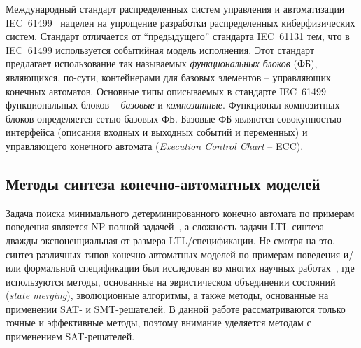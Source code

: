 
Международный стандарт распределенных систем управления и автоматизации IEC~61499~\cite{vyatkin-tii} нацелен на упрощение разработки распределенных киберфизических систем.
Стандарт отличается от \enquote{предыдущего} стандарта IEC~61131\cite{iec-61131} тем, что в IEC~61499 используется событийная модель исполнения.
Этот стандарт предлагает использование так называемых \emph{функциональных блоков} (ФБ), являющихся, по-сути, контейнерами для базовых элементов \--- управляющих конечных автоматов.
Основные типы описываемых в стандарте IEC~61499 функциональных блоков \--- \emph{базовые} и \emph{композитные}.
Функционал композитных блоков определяется сетью базовых ФБ.
Базовые ФБ являются совокупностью интерфейса (описания входных и выходных событий и переменных) и управляющего конечного автомата (\textit{Execution Control Chart} \--- ECC).


\subsection{Методы синтеза конечно-автоматных моделей}
\label{sub:automata-synthesis}


Задача поиска минимального детерминированного конечно автомата по примерам поведения является NP-полной задачей~\cite{gold}, а сложность задачи LTL-синтеза дважды экспоненциальная от размера LTL\-/спецификации.
Не смотря на это, синтез различных типов конечно-автоматных моделей по примерам поведения и/или формальной спецификации был исследован во многих научных работах~\cite{heule2010,efsm-tools,zakirzyanov2019,buzhinsky-tii,bosy,tsarev-egorov-gecco,giantamidis-tripakis,petrenko,petrenko2,neider,g4ltl-st,smetsers-lata}, где используются методы, основанные на эвристическом объединении состояний (\emph{state merging}), эволюционные алгоритмы, а также методы, основанные на применении SAT- и SMT-решателей.
В данной работе рассматриваются только точные и эффективные методы, поэтому внимание уделяется методам с применением SAT-решателей.

